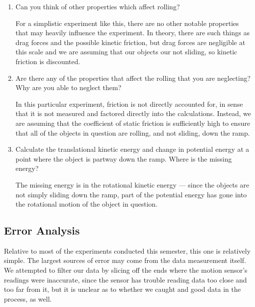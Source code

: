 \begin{enumerate}
\begin{itemize}
\end{itemize}

\item Can you think of other properties which affect rolling?

For a simplistic experiment like this, there are no other notable properties that may heavily influence the experiment.
In theory, there are such things as drag forces and the possible kinetic friction, but drag forces are negligible at this scale and we are assuming that our objects our not sliding, so kinetic friction is discounted.

\item Are there any of the properties that affect the rolling that you are neglecting?
Why are you able to neglect them?

In this particular experiment, friction is not directly accounted for, in sense that it is not measured and factored directly into the calculations.
Instead, we are assuming that the coefficient of static friction is sufficiently high to ensure that all of the objects in question are rolling, and not sliding, down the ramp.

\item Calculate the translational kinetic energy and change in potential energy at a point where the object is partway down the ramp.
Where is the missing energy?

The missing energy is in the rotational kinetic energy --- since the objects are not simply sliding down the ramp, part of the potential energy has gone into the rotational motion of the object in question.

\end{enumerate}

\subsection{Error Analysis}

Relative to most of the experiments conducted this semester, this one is relatively simple.
The largest sources of error may come from the data measurement itself.
We attempted to filter our data by slicing off the ends where the motion sensor's readings were inaccurate, since the sensor has trouble reading data too close and too far from it, but it is unclear as to whether we caught
and good data in the process, as well.

